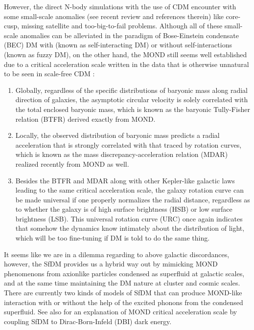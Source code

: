 \documentclass[aps,prd,twocolumn,10pt,groupedaddress]{revtex4-1}
\begin{document}
However, the direct N-body simulations with the use of CDM encounter with some small-scale anomalies (see recent review \cite{Tulin:2017ara} and references therein) like core-cusp, missing satellite and too-big-to-fail problems. Although all of these small-scale anomalies can be alleviated in the paradigm of Bose-Einstein condensate (BEC) DM \cite{Suarez:2013iw} with (known as self-interacting DM) or without self-interactions (known as fuzzy DM), on the other hand, the MOND still seems well established \cite{Famaey:2011kh} due to a critical acceleration scale written in the data that is otherwise unnatural to be seen in scale-free CDM :
\begin{enumerate}
  \item Globally, regardless of the specific distributions of baryonic mass along radial direction of galaxies, the asymptotic circular velocity is solely correlated with the total enclosed baryonic mass, which is known as the baryonic Tully-Fisher relation (BTFR) \cite{Tully:1977fu,McGaugh:2000sr} derived exactly from MOND.
  \item Locally, the observed distribution of baryonic mass predicts a radial acceleration that is strongly correlated with that traced by rotation curves, which is known as the mass discrepancy-acceleration relation (MDAR) \cite{McGaugh:2004aw,McGaugh:2014xfa,McGaugh:2016leg,Lelli:2017vgz} realized recently from MOND \cite{Milgrom:2016ogb} as well.
  \item Besides the BTFR and MDAR along with other Kepler-like galactic laws \cite{Famaey:2011kh} leading to the same critical acceleration scale, the galaxy rotation curve can be made universal \cite{Verheijen1999} if one properly normalizes the radial distance, regardless as to whether the galaxy is of high surface brightness (HSB) or low surface brightness (LSB). This universal rotation curve (URC) \cite{PersicSalucci} once again indicates that somehow the dynamics know intimately about the distribution of light, which will be too fine-tuning if DM is told to do the same thing.
\end{enumerate}

It seems like we are in a dilemma \cite{McGaugh:2014nsa} regarding to above galactic discordances, however, the SfDM provides us a hybrid way out by mimicking MOND phenomenons from axionlike particles condensed as superfluid at galactic scales, and at the same time maintaining the DM nature at cluster and cosmic scales. There are currently two kinds of models of SfDM that can produce MOND-like interaction with \cite{Berezhiani:2015bqa} or without \cite{Khoury:2016ehj} the help of the excited phonons from the condensed superfluid. See also \cite{Cai:2015rns} for an explanation of MOND critical acceleration scale by coupling  SfDM  to Dirac-Born-Infeld (DBI) dark energy.
\end{document}

